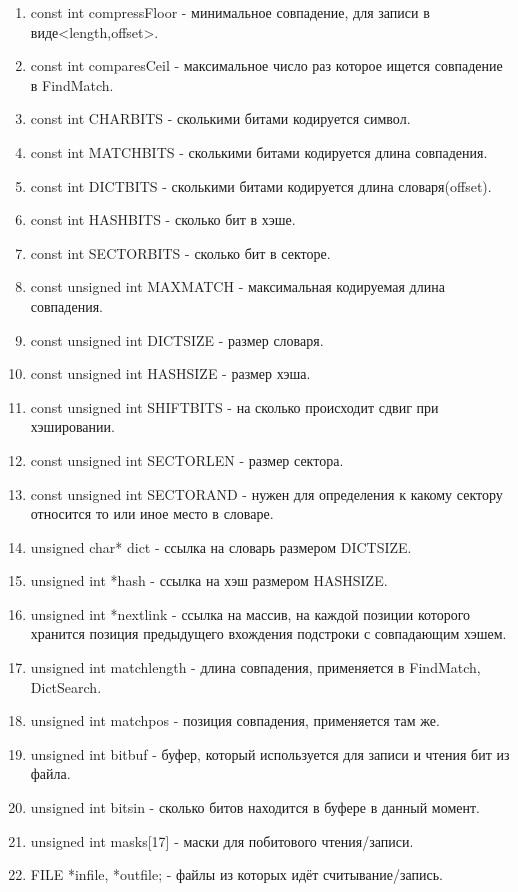 \documentclass[12pt]{article}
\begin{document}
\begin{enumerate}
	\item const int compressFloor - минимальное совпадение, для записи в виде<length,offset>.
	\item const int comparesCeil  - максимальное число раз которое ищется совпадение в FindMatch.
	\item const int CHARBITS    - сколькими битами кодируется символ.
	\item const int MATCHBITS     - сколькими битами кодируется длина совпадения.     
	\item const int DICTBITS     - сколькими битами кодируется длина словаря(offset).     
	\item const int HASHBITS     - сколько бит в хэше.
	\item const int SECTORBITS     - сколько бит в секторе.    
	\item const unsigned int MAXMATCH - максимальная кодируемая длина совпадения.
	\item const unsigned int DICTSIZE - размер словаря.
	\item const unsigned int HASHSIZE - размер хэша.
	\item const unsigned int SHIFTBITS  - на сколько происходит сдвиг при хэшировании.
	\item const unsigned int SECTORLEN  - размер сектора.
	\item const unsigned int SECTORAND  - нужен для определения к какому сектору относится то или иное место в словаре.
	\item unsigned char* dict - ссылка на словарь размером DICTSIZE.
	\item unsigned int *hash - ссылка на хэш размером HASHSIZE.
	\item unsigned int *nextlink - ссылка на массив, на каждой позиции которого хранится позиция предыдущего вхождения подстроки с совпадающим хэшем.
	\item unsigned int matchlength - длина совпадения, применяется в FindMatch, DictSearch.
	\item unsigned int  matchpos - позиция совпадения, применяется там же.
	\item unsigned int  bitbuf - буфер, который используется для записи и чтения бит из файла.
	\item unsigned int  bitsin - сколько битов находится в буфере в данный момент.
	\item unsigned int  masks[17] - маски для побитового чтения/записи.
	\item FILE *infile, *outfile; - файлы из которых идёт считывание/запись.
\end{enumerate}
\end{document}
